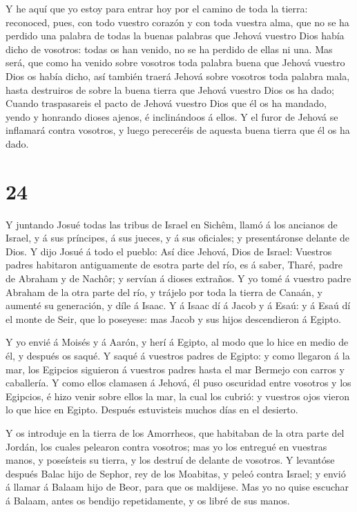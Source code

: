  Y he aquí que yo estoy para entrar hoy por el camino de
toda la tierra: reconoced, pues, con todo vuestro corazón y con toda
vuestra alma, que no se ha perdido una palabra de todas la buenas
palabras que Jehová vuestro Dios había dicho de vosotros: todas os han
venido, no se ha perdido de ellas ni una.  Mas será, que
como ha venido sobre vosotros toda palabra buena que Jehová vuestro Dios
os había dicho, así también traerá Jehová sobre vosotros toda palabra
mala, hasta destruiros de sobre la buena tierra que Jehová vuestro Dios
os ha dado;  Cuando traspasareis el pacto de Jehová vuestro
Dios que él os ha mandado, yendo y honrando dioses ajenos, é
inclinándoos á ellos. Y el furor de Jehová se inflamará contra vosotros,
y luego pereceréis de aquesta buena tierra que él os ha dado.

\hypertarget{section-23}{%
\section{24}\label{section-23}}

 Y juntando Josué todas las tribus de Israel en Sichêm,
llamó á los ancianos de Israel, y á sus príncipes, á sus jueces, y á sus
oficiales; y presentáronse delante de Dios.  Y dijo Josué á
todo el pueblo: Así dice Jehová, Dios de Israel: Vuestros padres
habitaron antiguamente de esotra parte del río, es á saber, Tharé, padre
de Abraham y de Nachôr; y servían á dioses extraños.  Y yo
tomé á vuestro padre Abraham de la otra parte del río, y trájelo por
toda la tierra de Canaán, y aumenté su generación, y díle á Isaac.
 Y á Isaac dí á Jacob y á Esaú: y á Esaú dí el monte de
Seir, que lo poseyese: mas Jacob y sus hijos descendieron á Egipto.

 Y yo envié á Moisés y á Aarón, y herí á Egipto, al modo que
lo hice en medio de él, y después os saqué.  Y saqué á
vuestros padres de Egipto: y como llegaron á la mar, los Egipcios
siguieron á vuestros padres hasta el mar Bermejo con carros y
caballería.  Y como ellos clamasen á Jehová, él puso
oscuridad entre vosotros y los Egipcios, é hizo venir sobre ellos la
mar, la cual los cubrió: y vuestros ojos vieron lo que hice en Egipto.
Después estuvisteis muchos días en el desierto.

 Y os introduje en la tierra de los Amorrheos, que habitaban
de la otra parte del Jordán, los cuales pelearon contra vosotros; mas yo
los entregué en vuestras manos, y poseísteis su tierra, y los destruí de
delante de vosotros.  Y levantóse después Balac hijo de
Sephor, rey de los Moabitas, y peleó contra Israel; y envió á llamar á
Balaam hijo de Beor, para que os maldijese.  Mas yo no
quise escuchar á Balaam, antes os bendijo repetidamente, y os libré de
sus manos.

